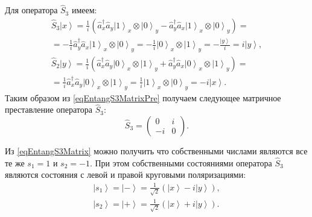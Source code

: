 Для оператора $\hat{S}_3$ имеем:
\begin{eqnarray}
  \hat{S}_3 \left|x\right> = \frac{1}{i}\left(\hat{a}_x^{\dag} \hat{a}_y
\left|1\right>_x\otimes\left|0\right>_y - \hat{a}_y^{\dag}
\hat{a}_x\left|1\right>_x\otimes\left|0\right>_y\right) =
\nonumber \\
= 
-\frac{1}{i}\hat{a}_y^{\dag}
\hat{a}_x\left|1\right>_x\otimes\left|0\right>_y =
-\frac{1}{i}\left|0\right>_x\otimes\left|1\right>_y =
-\frac{\left|y\right>}{i} = i \left|y\right>,
\nonumber \\
\hat{S}_2 \left|y\right> = \frac{1}{i}\left(\hat{a}_x^{\dag} \hat{a}_y
\left|0\right>_x\otimes\left|1\right>_y + \hat{a}_y^{\dag}
\hat{a}_x\left|0\right>_x\otimes\left|1\right>_y\right) =
\nonumber \\
=
\frac{1}{i}\hat{a}_x^{\dag} \hat{a}_y
\left|0\right>_x\otimes\left|1\right>_y
=\frac{1}{i}\left|1\right>_x\otimes\left|0\right>_y =
-i \left|x\right>.
\label{eqEntangS3MatrixPre}
\end{eqnarray}
Таким образом из \eqref{eqEntangS3MatrixPre} получаем следующее
матричное преставление оператора $\hat{S}_3$:
\begin{equation}
\hat{S}_3 = 
\left(
\begin{array}{cc}
0 & i \\
-i & 0 
\end{array}
\right).
\label{eqEntangS3Matrix}
\end{equation}


Из \eqref{eqEntangS3Matrix} можно получить что собственными числами
являются все те же $s_1 = 1$ и $s_2 = -1$. При этом собственными
состояниями оператора $\hat{S}_3$ являются состояния с левой и правой
круговыми поляризациями:
\begin{eqnarray}
  \left| s_1 \right> = \left| - \right> = \frac{1}{\sqrt{2}}
  \left(
  \left|x\right> - i \left|y\right>
  \right),
  \nonumber \\
  \left| s_2 \right> = \left| + \right> = \frac{1}{\sqrt{2}}
  \left(
  \left|x\right> + i \left|y\right>
  \right).
  \label{eqEntangS3Eigenvec}
\end{eqnarray}


